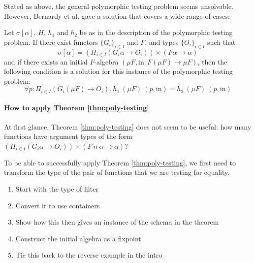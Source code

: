 \documentclass{llncs}
\begin{document}
Stated as above, the general polymorphic testing problem seems
unsolvable. However, Bernardy et al. gave a solution that covers a
wide range of cases:

\begin{theorem}\label{thm:poly-testing}
  Let $\sigma[\alpha]$, $H$, $h_1$ and $h_2$ be as in the description
  of the polymorphic testing problem. If there exist functors
  $\{G_i\}_{i \in I}$ and $F$, and types $\{O_i\}_{i \in I}$ such that
  \begin{displaymath}
    \sigma[\alpha] = \left( \Pi_{i \in I} (G_i \alpha \to O_i)\right) \times  (F \alpha \to \alpha)
  \end{displaymath}
  and if there exists an initial $F$-algebra
  $(\mu F, \mathrm{in} : F(\mu F) \to \mu F)$, then the following
  condition is a solution for this instance of the polymorphic testing
  problem:
  \begin{equation}
    \label{eq:solution-pt}
    \forall p : \Pi_{i \in I}(G_i(\mu F) \to O_i).~h_1~(\mu F)~(p,
    \mathrm{in}) = h_2~(\mu F)~(p, \mathrm{in})
  \end{equation}
\end{theorem}

\paragraph{How to apply Theorem \ref{thm:poly-testing}} At first
glance, Theorem \ref{thm:poly-testing} does not seem to be useful: how
many functions have argument types of the form
$\left(\Pi_{i \in I}(G_i \alpha \to O_i)\right) \times (F~n~\alpha \to
\alpha)$?

To be able to successfully apply Theorem \ref{thm:poly-testing}, we
first need to transform the type of the pair of functions that we are
testing for equality.

\begin{enumerate}
\item Start with the type of filter
\item Convert it to use containers
\item Show how this then gives an instance of the schema in the theorem
\item Construct the initial algebra as a fixpoint
\item Tie this back to the reverse example in the intro
\end{enumerate}
\end{document}
